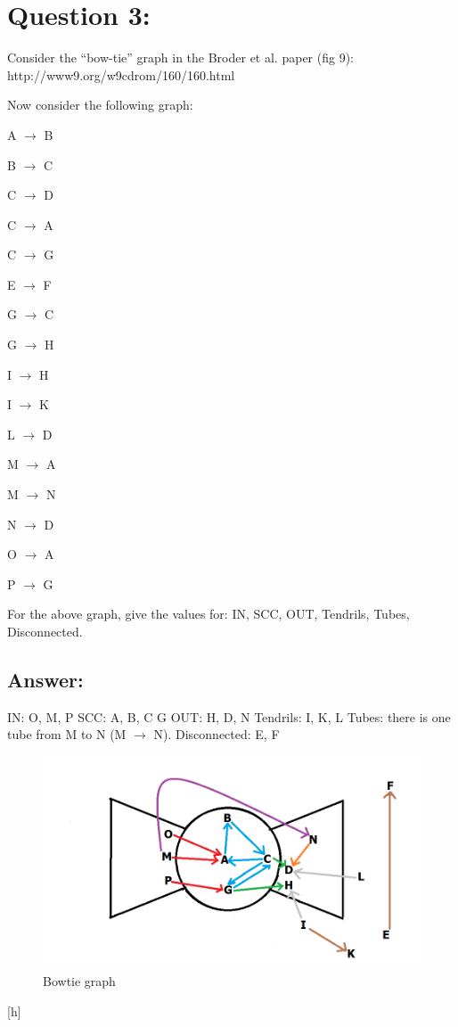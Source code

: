 \documentclass[a4paper, 11pt]{article}
\begin{document}
\fi


\section*{Question 3:}
Consider the ``bow-tie'' graph in the Broder et al. paper (fig 9):
    http://www9.org/w9cdrom/160/160.html

    Now consider the following graph:

    A $\longrightarrow$ B
    
    B $\longrightarrow$ C
    
    C $\longrightarrow$ D
    
    C $\longrightarrow$ A
    
    C $\longrightarrow$ G
    
    E $\longrightarrow$ F
    
    G $\longrightarrow$ C
    
    G $\longrightarrow$ H
    
    I $\longrightarrow$ H
    
    I $\longrightarrow$ K
    
    L $\longrightarrow$ D
    
    M $\longrightarrow$ A
    
    M $\longrightarrow$ N
    
    N $\longrightarrow$ D
    
    O $\longrightarrow$ A
    
    P $\longrightarrow$ G 
    
    For the above graph, give the values for: IN, SCC, OUT, Tendrils, Tubes, Disconnected.

\subsection*{Answer:}
IN: O, M, P
\noindent
\newline
SCC: A, B, C G
\noindent
\newline
OUT: H, D, N
\noindent
\newline
Tendrils: I, K, L
\noindent
\newline
Tubes: there is one tube from M to N (M $\longrightarrow$ N).
\noindent
\newline
Disconnected: E, F
\begin{figure}[h]
\caption{Bowtie graph}
\centering
\includegraphics[scale=0.5]{bowtie.png}

\end{figure}[h]
\end{document}
